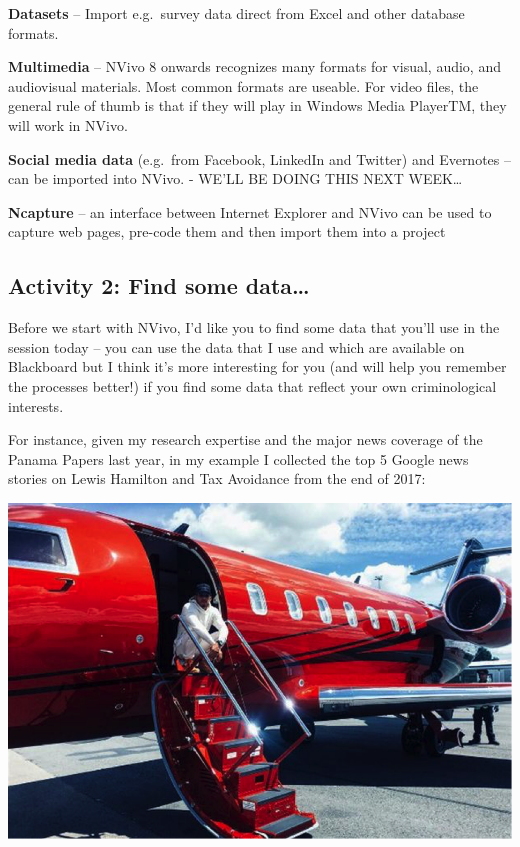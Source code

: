 \documentclass[]{book}
\theoremstyle{definition}
\theoremstyle{definition}
\theoremstyle{definition}
\theoremstyle{remark}
\begin{document}
\textbf{Datasets} -- Import e.g.~survey data direct from Excel and other
database formats.

\textbf{Multimedia} -- NVivo 8 onwards recognizes many formats for
visual, audio, and audiovisual materials. Most common formats are
useable. For video files, the general rule of thumb is that if they will
play in Windows Media PlayerTM, they will work in NVivo.

\textbf{Social media data} (e.g.~from Facebook, LinkedIn and Twitter)
and Evernotes -- can be imported into NVivo. - WE'LL BE DOING THIS NEXT
WEEK\ldots{}

\textbf{Ncapture} -- an interface between Internet Explorer and NVivo
can be used to capture web pages, pre-code them and then import them
into a project

\hypertarget{activity-2-find-some-data}{%
\subsection{Activity 2: Find some
data\ldots{}}\label{activity-2-find-some-data}}

Before we start with NVivo, I'd like you to find some data that you'll
use in the session today -- you can use the data that I use and which
are available on Blackboard but I think it's more interesting for you
(and will help you remember the processes better!) if you find some data
that reflect your own criminological interests.

For instance, given my research expertise and the major news coverage of
the Panama Papers last year, in my example I collected the top 5 Google
news stories on Lewis Hamilton and Tax Avoidance from the end of 2017:

\includegraphics{imgs/qual_02.png}
\end{document}
